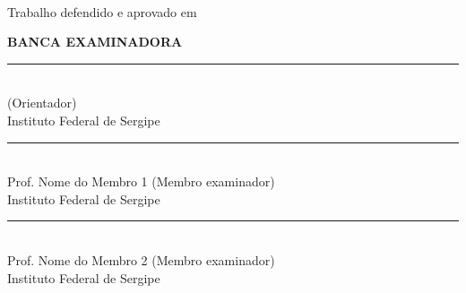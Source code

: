 \begin{folhadeaprovacao}
  \thispagestyle{empty}
  \begin{center}
    \MakeUppercase{\imprimirautor} \\
    \vspace{2cm}
    \begin{OnehalfSpacing}
      \MakeUppercase{\textbf{\imprimirtitulo}}
      \ifthenelse{\equal{\imprimirsubtitulo}{}}{}{\MakeUppercase{\textbf{\unskip: \\ \imprimirsubtitulo}} \\}
    \end{OnehalfSpacing}
  \end{center}

  \vspace{1cm}

  \begin{flushright}
    \parbox{\dimexpr\textwidth-8cm\relax}{%
      \imprimirpreambulo
    }
  \end{flushright}

  \vspace{1cm}

  \begin{center}
    Trabalho defendido e aprovado em \imprimirdata %
  \end{center}

  \begin{center}
    \textbf{BANCA EXAMINADORA}
    \vfill
    \rule{10cm}{.1pt} \\ {\imprimirorientador \space(Orientador) \\ Instituto Federal de Sergipe}
    \vfill
    \rule{10cm}{.1pt} \\ {Prof. Nome do Membro 1 (Membro examinador) \\ Instituto Federal de Sergipe}
    \vfill
    \rule{10cm}{.1pt} \\ {Prof. Nome do Membro 2 (Membro examinador) \\ Instituto Federal de Sergipe}
  \end{center}

\end{folhadeaprovacao}
